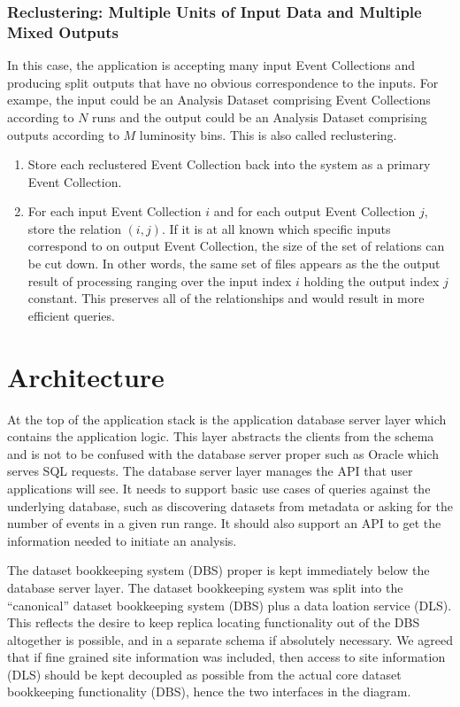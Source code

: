 \documentclass{cmspaper}
\begin{document}
\subsubsection{Reclustering: Multiple Units of Input Data and Multiple Mixed Outputs}

In this case, the application is accepting many input Event Collections
and producing split outputs that have no obvious correspondence to the 
inputs.  For exampe, the input could be 
an Analysis Dataset comprising Event Collections according to $N$ runs and the 
output could be an Analysis Dataset comprising outputs 
according to $M$ luminosity bins.  This is also called reclustering.
\begin{enumerate}
\item Store each reclustered Event Collection back into the system as a
primary Event Collection. 
\item For each input Event Collection $i$ and for each output Event Collection $j$,
store the relation $(i,j)$.  If it is at all known which specific inputs correspond to 
on output Event Collection,  the size of the set of relations can be cut down. 
In other words, the same set of 
files appears as the the output result of processing ranging over the input 
index $i$ holding the output index $j$ constant.  This 
preserves  all of the relationships and would 
result in more efficient queries.
\end{enumerate}



\section{Architecture}


At the top of the application stack is the application database server layer which contains
the application logic.  This layer abstracts the clients from the schema and is not 
to be confused with the database server proper such as Oracle which serves SQL requests.
The database server layer manages the API that user applications will see.  It needs to 
support basic use cases of queries against the underlying database, such as discovering 
datasets from metadata or asking for the number of events in a given run range.  It 
should also support an API to get the information needed to initiate an analysis.  

The dataset bookkeeping system (DBS) proper is kept immediately below the database 
server layer.  The dataset bookkeeping system was split into the ``canonical'' dataset 
bookkeeping system (DBS) plus a data loation service (DLS).  This reflects the 
desire to keep replica locating functionality out of the DBS altogether is possible, 
and in a separate schema if absolutely necessary.    We agreed that if fine grained 
site information was included, then access to site information (DLS) should be kept 
decoupled as possible from the actual core dataset bookkeeping functionality (DBS), 
hence the two interfaces in the diagram.  
\end{document}
